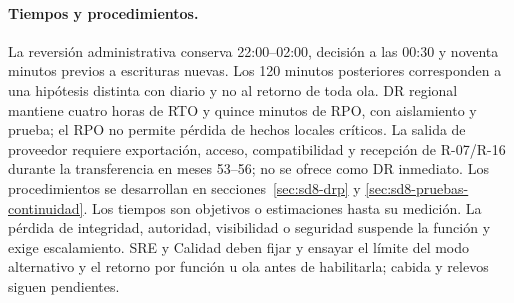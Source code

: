 \paragraph{Tiempos y procedimientos.}
La reversión administrativa conserva 22:00--02:00, decisión a las 00:30 y noventa minutos previos a escrituras nuevas. Los 120 minutos posteriores corresponden a una hipótesis distinta con diario y no al retorno de toda ola. DR regional mantiene cuatro horas de RTO y quince minutos de RPO, con aislamiento y prueba; el RPO no permite pérdida de hechos locales críticos. La salida de proveedor requiere exportación, acceso, compatibilidad y recepción de R-07/R-16 durante la transferencia en meses 53--56; no se ofrece como DR inmediato. Los procedimientos se desarrollan en secciones~\ref{sec:sd8-drp} y \ref{sec:sd8-pruebas-continuidad}. Los tiempos son objetivos o estimaciones hasta su medición. La pérdida de integridad, autoridad, visibilidad o seguridad suspende la función y exige escalamiento. SRE y Calidad deben fijar y ensayar el límite del modo alternativo y el retorno por función u ola antes de habilitarla; cabida y relevos siguen pendientes.

